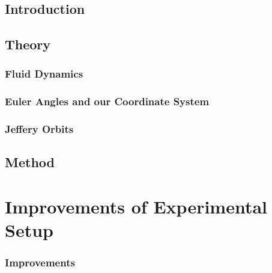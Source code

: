 \documentclass[]{report}
\begin{document}




\setcounter{page}{1}
\pagestyle{fancy}
\setspecialhdr
\tableofcontents


\newpage
\setdefaulthdr
{}	
\setcounter{page}{1}

\chapter{Introduction}



\chapter{Theory}


\section{Fluid Dynamics}


\section{Euler Angles and our Coordinate System}


\section{Jeffery Orbits}


\chapter{Method}

\part{Improvements of Experimental Setup}

\section{Improvements}
\end{document}

